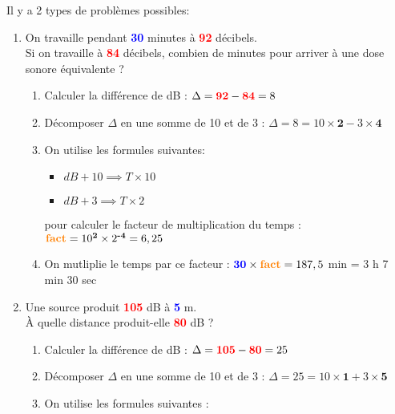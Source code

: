 \documentclass[class=article, crop=false]{standalone}
\begin{document}
Il y a 2 types de problèmes possibles:
\begin{enumerate}
    \item On travaille pendant \textcolor{blue}{\textbf{30}} minutes à \textcolor{red}{\textbf{92}} décibels. \\
    Si on travaille à \textcolor{red}{\textbf{84}} décibels, combien de minutes pour arriver à une dose sonore équivalente ?
    \begin{example}
        \begin{enumerate}
            \item Calculer la différence de dB : $ \Delta = \textcolor{red}{\textbf{92}} - \textcolor{red}{\textbf{84}} = 8 $
            \item Décomposer $ \Delta $ en une somme de 10 et de 3 : $ \Delta = 8 = 10 \times \textbf{2} - 3 \times \textbf{4} $
            \item On utilise les formules suivantes:
            \begin{itemize}
                \item $ dB + 10 \implies T \times 10 $
                \item $ dB + 3 \implies T \times 2 $
            \end{itemize}
            pour calculer le facteur de multiplication du temps : $ \textcolor{orange}{\textbf{fact}} = 10^\textbf{2} \times 2^\textbf{-4} = 6,25 $
            \item On mutliplie le temps par ce facteur : $ \textcolor{blue}{\textbf{30}} \times \textcolor{orange}{\textbf{fact}} = 187,5 $ min = 3 h 7 min 30 sec
        \end{enumerate}
    \end{example}
    \item Une source produit \textcolor{red}{\textbf{105}} dB à \textcolor{blue}{\textbf{5}} m. \\
    À quelle distance produit-elle \textcolor{red}{\textbf{80}} dB ?
    \begin{example}
        \begin{enumerate}
            \item Calculer la différence de dB : $ \Delta = \textcolor{red}{\textbf{105}} - \textcolor{red}{\textbf{80}} = 25 $
            \item Décomposer $ \Delta $ en une somme de 10 et de 3 : $ \Delta = 25 = 10 \times \textbf{1} + 3 \times \textbf{5} $
            \item On utilise les formules suivantes :
            \begin{itemize}

\end{itemize}
\end{enumerate}
\end{example}
\end{enumerate}
\end{document}
